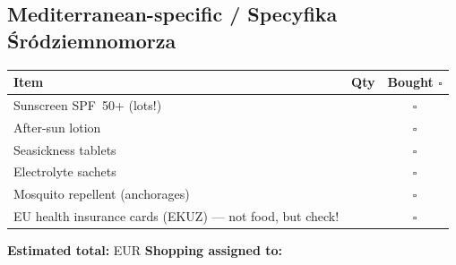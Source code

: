 \documentclass[a4paper,11pt]{article}
\begin{document}
\subsection*{Mediterranean-specific / Specyfika Śródziemnomorza}
\begin{tabularx}{\linewidth}{|X|c|c|}
\hline
\textbf{Item} & \textbf{Qty} & \textbf{Bought \(\square\)} \\
\hline
Sunscreen SPF~50+ (lots!) & & \(\square\) \\[4pt]\hline
After-sun lotion & & \(\square\) \\[4pt]\hline
Seasickness tablets & & \(\square\) \\[4pt]\hline
Electrolyte sachets & & \(\square\) \\[4pt]\hline
Mosquito repellent (anchorages) & & \(\square\) \\[4pt]\hline
EU health insurance cards (EKUZ) --- not food, but check! & & \(\square\) \\[4pt]\hline
\end{tabularx}

\vspace{0.4cm}
\noindent\textbf{Estimated total:} \field{4cm} EUR \hfill \textbf{Shopping assigned to:} \field{5cm}
\end{document}
